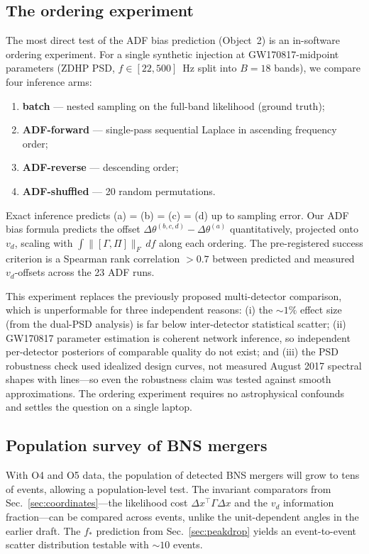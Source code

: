 \documentclass[twocolumn,prd,showpacs,superscriptaddress]{revtex4-2}
\newcommand{\vd}{v_{d}}          %
\newcommand{\secref}[1]{Sec.~\ref{sec:#1}}
\begin{document}
\subsection{The ordering experiment}
\label{sec:ordering}

The most direct test of the ADF bias prediction (Object~2) is an
in-software ordering experiment.  For a single synthetic injection at
GW170817-midpoint parameters (ZDHP PSD, $f \in [22, 500]$~Hz split
into $B=18$ bands), we compare four inference arms:

\begin{enumerate}
  \item[(a)] \textbf{batch} --- nested sampling on the full-band
  likelihood (ground truth);
  \item[(b)] \textbf{ADF-forward} --- single-pass sequential Laplace
  in ascending frequency order;
  \item[(c)] \textbf{ADF-reverse} --- descending order;
  \item[(d)] \textbf{ADF-shuffled} --- 20 random permutations.
\end{enumerate}

Exact inference predicts (a) = (b) = (c) = (d) up to sampling error.
Our ADF bias formula predicts the offset $\Delta\theta^{(b,c,d)} -
\Delta\theta^{(a)}$ quantitatively, projected onto $\vd$, scaling with
$\int \|[\Gamma, \Pi]\|_F\,df$ along each ordering.  The pre-registered
success criterion is a Spearman rank correlation $> 0.7$ between
predicted and measured $\vd$-offsets across the 23 ADF runs.

This experiment replaces the previously proposed multi-detector
comparison, which is unperformable for three independent reasons:
(i) the $\sim1\%$ effect size (from the dual-PSD analysis) is far
below inter-detector statistical scatter; (ii) GW170817 parameter
estimation is coherent network inference, so independent per-detector
posteriors of comparable quality do not exist; and (iii) the PSD
robustness check used idealized design curves, not measured August 2017
spectral shapes with lines---so even the robustness claim was tested
against smooth approximations.  The ordering experiment requires no
astrophysical confounds and settles the question on a single laptop.

\subsection{Population survey of BNS mergers}

With O4 and O5 data, the population of detected BNS mergers will grow
to tens of events, allowing a population-level test.  The invariant
comparators from \secref{coordinates}---the likelihood cost
$\Delta x^{\top}\Gamma\Delta x$ and the $\vd$ information fraction---can
be compared across events, unlike the unit-dependent angles in the
earlier draft.  The $f_*$ prediction from \secref{peakdrop} yields an
event-to-event scatter distribution testable with $\sim10$ events.
\end{document}
